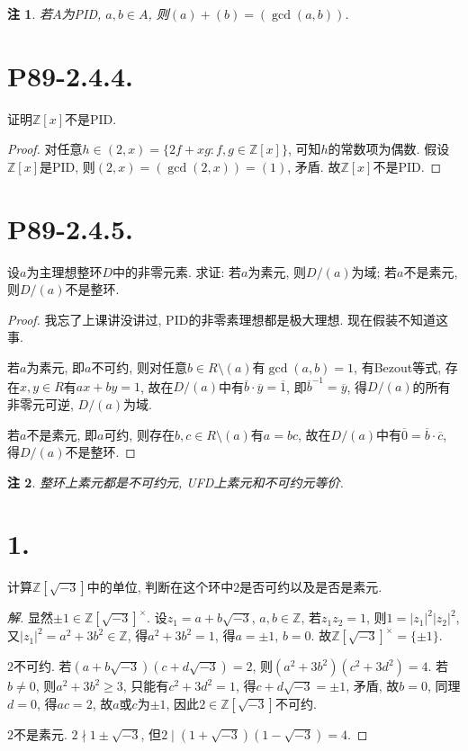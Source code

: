 \documentclass[12pt, a4paper, fontset=windows]{ctexart}
\newcommand{\Z}{\mathbb{Z}}
\newcommand{\abs}[1]{\left|{#1}\right|}
\newcommand{\cl}[1]{\overline{#1}} %
\newcommand{\unit}[1]{{#1}^\times}
\newtheorem*{remark}{注}
\newenvironment{solution}{\begin{proof}[解]}{\end{proof}}
\begin{document}
\begin{remark}
若$A$为PID, $a,b\in A$, 则$(a)+(b)=(\gcd(a,b))$. 
\end{remark}

\section*{P89-2.4.4.}

证明$\Z[x]$不是PID. 

\begin{proof}
对任意$h\in(2,x)=\{2f+xg:f,g\in\Z[x]\}$, 
可知$h$的常数项为偶数. 假设$\Z[x]$是PID, 
则$(2,x)=(\gcd(2,x))=(1)$, 矛盾. 故$\Z[x]$不是PID. 
\end{proof}

\section*{P89-2.4.5.}

设$a$为主理想整环$D$中的非零元素. 求证: 若$a$为素元, 
则$D/(a)$为域; 若$a$不是素元, 则$D/(a)$不是整环. 

\begin{proof}
我忘了上课讲没讲过, PID的非零素理想都是极大理想. 现在假装不知道这事. 

若$a$为素元, 即$a$不可约, 则对任意$b\in R\setminus(a)$有$\gcd(a,b)=1$, 
有Bezout等式, 存在$x,y\in R$有$ax+by=1$, 故在$D/(a)$中有$\cl{b}\cdot\cl{y}=\cl{1}$, 
即$\cl{b}^{-1}=\cl{y}$, 得$D/(a)$的所有非零元可逆, $D/(a)$为域. 

若$a$不是素元, 即$a$可约, 则存在$b,c\in R\setminus(a)$有$a=bc$, 
故在$D/(a)$中有$\cl{0}=\cl{b}\cdot\cl{c}$, 得$D/(a)$不是整环. 
\end{proof}

\begin{remark}
整环上素元都是不可约元, UFD上素元和不可约元等价. 
\end{remark}

\section*{1.}

计算$\Z[\sqrt{-3}]$中的单位, 判断在这个环中$2$是否可约以及是否是素元. 

\begin{solution}
显然$\pm 1\in\unit{\Z[\sqrt{-3}]}$. 设$z_1=a+b\sqrt{-3}$, 
$a,b\in\Z$, 若$z_1z_2=1$, 则$1=\abs{z_1}^2\abs{z_2}^2$, 
又$\abs{z_1}^2=a^2+3b^2\in\Z$, 得$a^2+3b^2=1$, 
得$a=\pm 1$, $b=0$. 故$\unit{\Z[\sqrt{-3}]}=\{\pm 1\}$. 

$2$不可约. 若$(a+b\sqrt{-3})(c+d\sqrt{-3})=2$, 
则$(a^2+3b^2)(c^2+3d^2)=4$. 若$b\ne 0$, 则$a^2+3b^2\ge 3$, 
只能有$c^2+3d^2=1$, 得$c+d\sqrt{-3}=\pm 1$, 矛盾, 
故$b=0$, 同理$d=0$, 得$ac=2$, 故$a$或$c$为$\pm 1$, 
因此$2\in\Z[\sqrt{-3}]$不可约. 

$2$不是素元. $2\nmid 1\pm\sqrt{-3}$, 
但$2\mid (1+\sqrt{-3})(1-\sqrt{-3})=4$. 
\end{solution}
\end{document}

